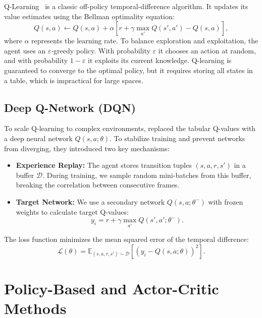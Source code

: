 Q-Learning~\citep{watkins1992qlearning} is a classic off-policy temporal-difference algorithm. It updates its value estimates using the Bellman optimality equation:
\begin{equation}
    Q(s,a) \leftarrow Q(s,a) + \alpha \left[ r + \gamma \max_{a'} Q(s', a') - Q(s,a) \right],
    \label{eq:qlearning}
\end{equation}
where $\alpha$ represents the learning rate. To balance exploration and exploitation, the agent uses an $\varepsilon$-greedy policy. With probability $\varepsilon$ it chooses an action at random, and with probability $1 - \varepsilon$ it exploits its current knowledge. Q-learning is guaranteed to converge to the optimal policy, but it requires storing all states in a table, which is impractical for large spaces.

\subsection{Deep Q-Network (DQN)}

To scale Q-learning to complex environments, \cite{mnih2015humanlevel} replaced the tabular Q-values with a deep neural network $Q(s,a;\theta)$. To stabilize training and prevent networks from diverging, they introduced two key mechanisms:
\begin{itemize}
    \item \textbf{Experience Replay:} The agent stores transition tuples $(s, a, r, s')$ in a buffer $\mathcal{D}$. During training, we sample random mini-batches from this buffer, breaking the correlation between consecutive frames.
    \item \textbf{Target Network:} We use a secondary network $Q(s,a;\theta^-)$ with frozen weights to calculate target Q-values:
    \begin{equation}
        y_i = r + \gamma \max_{a'} Q(s', a'; \theta^-).
        \label{eq:dqn_target}
    \end{equation}
\end{itemize}
The loss function minimizes the mean squared error of the temporal difference:
\begin{equation}
    \mathcal{L}(\theta) = \mathbb{E}_{(s,a,r,s') \sim \mathcal{D}} \left[ \left( y_i - Q(s,a;\theta) \right)^2 \right].
    \label{eq:dqn_loss}
\end{equation}

\section{Policy-Based and Actor-Critic Methods}
\label{sec:lit_policy_based}

